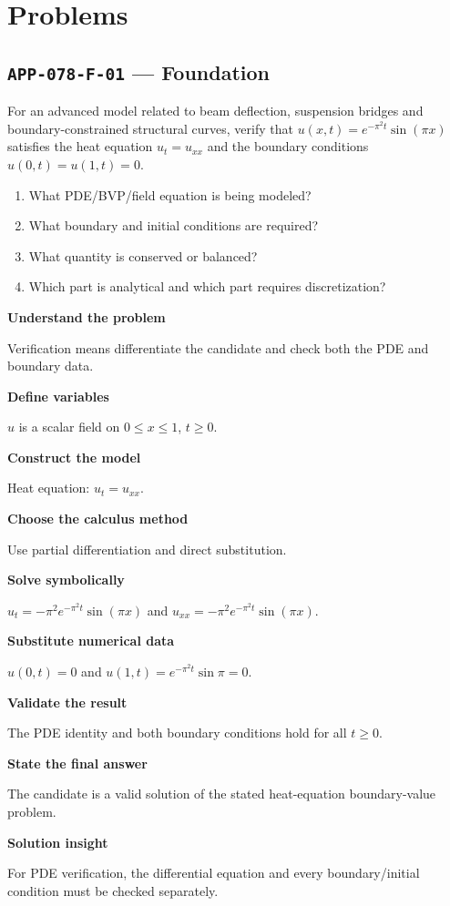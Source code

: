 \documentclass[11pt]{book}
\newcommand{\pid}[1]{\texttt{#1}}
\begin{document}
\section*{Problems}
\subsection*{\pid{APP-078-F-01} — Foundation}
\begin{problembox}
For an advanced model related to beam deflection, suspension bridges and boundary-constrained structural curves, verify that $u(x,t)=e^{-\pi^2t}\sin(\pi x)$ satisfies the heat equation $u_t=u_{xx}$ and the boundary conditions $u(0,t)=u(1,t)=0$.
\end{problembox}
\begin{promptbox}\begin{enumerate}
\item What PDE/BVP/field equation is being modeled?
\item What boundary and initial conditions are required?
\item What quantity is conserved or balanced?
\item Which part is analytical and which part requires discretization?
\end{enumerate}\end{promptbox}
\begin{solutionbox}
\textbf{Understand the problem}\par Verification means differentiate the candidate and check both the PDE and boundary data.\par\medskip
\textbf{Define variables}\par $u$ is a scalar field on $0\le x\le1$, $t\ge0$.\par\medskip
\textbf{Construct the model}\par Heat equation: $u_t=u_{xx}$.\par\medskip
\textbf{Choose the calculus method}\par Use partial differentiation and direct substitution.\par\medskip
\textbf{Solve symbolically}\par $u_t=-\pi^2 e^{-\pi^2t}\sin(\pi x)$ and $u_{xx}=-\pi^2 e^{-\pi^2t}\sin(\pi x)$.\par\medskip
\textbf{Substitute numerical data}\par $u(0,t)=0$ and $u(1,t)=e^{-\pi^2t}\sin\pi=0$.\par\medskip
\textbf{Validate the result}\par The PDE identity and both boundary conditions hold for all $t\ge0$.\par\medskip
\textbf{State the final answer}\par The candidate is a valid solution of the stated heat-equation boundary-value problem.\par\medskip
\textbf{Solution insight}\par For PDE verification, the differential equation and every boundary/initial condition must be checked separately.\par\medskip
\end{solutionbox}
\end{document}
